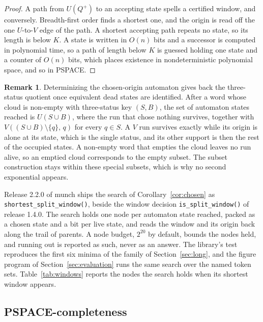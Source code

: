 \documentclass[11pt,a4paper]{article}
\theoremstyle{definition}
\newtheorem{remark}{Remark}
\theoremstyle{plain}
\newcommand{\code}[1]{\texttt{#1}}
\begin{document}
\begin{proof}
A path from $U(Q^+)$ to an accepting state spells a certified window, and conversely. Breadth-first order finds a
shortest one, and the origin is read off the one $U$-to-$V$ edge of the path. A shortest accepting path repeats no
state, so its length is below $K$. A state is written in $O(n)$ bits and a successor is computed in polynomial time, so
a path of length below $K$ is guessed holding one state and a counter of $O(n)$ bits, which places existence in
nondeterministic polynomial space, and so in PSPACE.
\end{proof}

\begin{remark}
\label{rem:determinize}
Determinizing the chosen-origin automaton gives back the three-status quotient once equivalent dead states are
identified. After a word whose cloud is non-empty with three-status key $(S, B)$, the set of automaton states reached is
$U(S \cup B)$, where the run that chose nothing survives, together with $V((S \cup B) \setminus \{q\},\, q)$ for every
$q \in S$. A $V$ run survives exactly while its origin is alone at its state, which is the single status, and its other
support is then the rest of the occupied states. A non-empty word that empties the cloud leaves no run alive, so an
emptied cloud corresponds to the empty subset. The subset construction stays within these special subsets, which is why
no second exponential appears.
\end{remark}

Release 2.2.0 of munch ships the search of Corollary~\ref{cor:chosen} as \code{shortest\_split\_window()}, beside the
window decision \code{is\_split\_window()} of release 1.4.0. The search holds one node per automaton state reached,
packed as a chosen state and a bit per live state, and reads the window and its origin back along the trail of parents.
A node budget, $2^{20}$ by default, bounds the nodes held, and running out is reported as such, never as an answer. The
library's test reproduces the first six minima of the family of Section~\ref{sec:long}, and the figure program of
Section~\ref{sec:evaluation} runs the same search over the named token sets. Table~\ref{tab:windows} reports the nodes
the search holds when its shortest window appears.

\subsection{PSPACE-completeness}
\label{sec:complexity}
\end{document}
